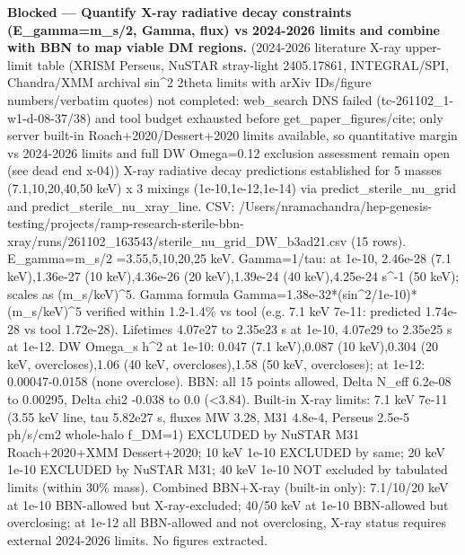 \documentclass[11pt,a4paper]{article}
\begin{document}
\textbf{Blocked --- Quantify X-ray radiative decay constraints (E\_gamma=m\_s/2, Gamma, flux) vs 2024-2026 limits and combine with BBN to map viable DM regions.} (2024-2026 literature X-ray upper-limit table (XRISM Perseus, NuSTAR stray-light 2405.17861, INTEGRAL/SPI, Chandra/XMM archival sin\textasciicircum{}2 2theta limits with arXiv IDs/figure numbers/verbatim quotes) not completed: web\_search DNS failed (tc-261102\_1-w1-d-08-37/38) and tool budget exhausted before get\_paper\_figures/cite; only server built-in Roach+2020/Dessert+2020 limits available, so quantitative margin vs 2024-2026 limits and full DW Omega=0.12 exclusion assessment remain open (see dead end x-04)) X-ray radiative decay predictions established for 5 masses (7.1,10,20,40,50 keV) x 3 mixings (1e-10,1e-12,1e-14) via predict\_sterile\_nu\_grid and predict\_sterile\_nu\_xray\_line. CSV: /Users/nramachandra/hep-genesis-testing/projects/ramp-research-sterile-bbn-xray/runs/261102\_163543/sterile\_nu\_grid\_DW\_b3ad21.csv (15 rows). E\_gamma=m\_s/2 =3.55,5,10,20,25 keV. Gamma=1/tau: at 1e-10, 2.46e-28 (7.1 keV),1.36e-27 (10 keV),4.36e-26 (20 keV),1.39e-24 (40 keV),4.25e-24 s\textasciicircum{}-1 (50 keV); scales as (m\_s/keV)\textasciicircum{}5. Gamma formula Gamma=1.38e-32*(sin\textasciicircum{}2/1e-10)*(m\_s/keV)\textasciicircum{}5 verified within 1.2-1.4\% vs tool (e.g. 7.1 keV 7e-11: predicted 1.74e-28 vs tool 1.72e-28). Lifetimes 4.07e27 to 2.35e23 s at 1e-10, 4.07e29 to 2.35e25 s at 1e-12. DW Omega\_s h\textasciicircum{}2 at 1e-10: 0.047 (7.1 keV),0.087 (10 keV),0.304 (20 keV, overcloses),1.06 (40 keV, overcloses),1.58 (50 keV, overcloses); at 1e-12: 0.00047-0.0158 (none overclose). BBN: all 15 points allowed, Delta N\_eff 6.2e-08 to 0.00295, Delta chi2 -0.038 to 0.0 (\textless{}3.84). Built-in X-ray limits: 7.1 keV 7e-11 (3.55 keV line, tau 5.82e27 s, fluxes MW 3.28, M31 4.8e-4, Perseus 2.5e-5 ph/s/cm2 whole-halo f\_DM=1) EXCLUDED by NuSTAR M31 Roach+2020+XMM Dessert+2020; 10 keV 1e-10 EXCLUDED by same; 20 keV 1e-10 EXCLUDED by NuSTAR M31; 40 keV 1e-10 NOT excluded by tabulated limits (within 30\% mass). Combined BBN+X-ray (built-in only): 7.1/10/20 keV at 1e-10 BBN-allowed but X-ray-excluded; 40/50 keV at 1e-10 BBN-allowed but overclosing; at 1e-12 all BBN-allowed and not overclosing, X-ray status requires external 2024-2026 limits. No figures extracted.
\end{document}
